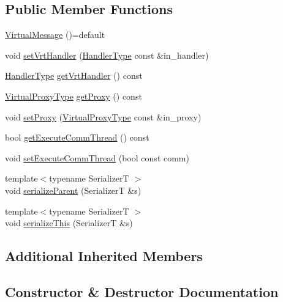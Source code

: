 \subsection*{Public Member Functions}
\begin{DoxyCompactItemize}
\item 
\hyperlink{structvt_1_1vrt_1_1_virtual_message_a28ae0fd29c23d4e9552e659ff7f66cd5}{Virtual\+Message} ()=default
\item 
void \hyperlink{structvt_1_1vrt_1_1_virtual_message_aea0a3a35d2517ef094c9467b0c4ff066}{set\+Vrt\+Handler} (\hyperlink{namespacevt_af64846b57dfcaf104da3ef6967917573}{Handler\+Type} const \&in\+\_\+handler)
\item 
\hyperlink{namespacevt_af64846b57dfcaf104da3ef6967917573}{Handler\+Type} \hyperlink{structvt_1_1vrt_1_1_virtual_message_aaa41fe4b317b868fdcceb7c119feec9c}{get\+Vrt\+Handler} () const
\item 
\hyperlink{namespacevt_a1b417dd5d684f045bb58a0ede70045ac}{Virtual\+Proxy\+Type} \hyperlink{structvt_1_1vrt_1_1_virtual_message_a37cbc50547e033f049af3c9d289036cc}{get\+Proxy} () const
\item 
void \hyperlink{structvt_1_1vrt_1_1_virtual_message_aa4b2b70c7d560be3adff74102803ff51}{set\+Proxy} (\hyperlink{namespacevt_a1b417dd5d684f045bb58a0ede70045ac}{Virtual\+Proxy\+Type} const \&in\+\_\+proxy)
\item 
bool \hyperlink{structvt_1_1vrt_1_1_virtual_message_a9511339ccb737b655708c9071965dc76}{get\+Execute\+Comm\+Thread} () const
\item 
void \hyperlink{structvt_1_1vrt_1_1_virtual_message_a8149137c049179f315d295b5127b61ad}{set\+Execute\+Comm\+Thread} (bool const comm)
\item 
{\footnotesize template$<$typename SerializerT $>$ }\\void \hyperlink{structvt_1_1vrt_1_1_virtual_message_a386aeadd621e63f38bda7d14ff629172}{serialize\+Parent} (SerializerT \&s)
\item 
{\footnotesize template$<$typename SerializerT $>$ }\\void \hyperlink{structvt_1_1vrt_1_1_virtual_message_aaa884a3606e1c569c07c4e7ef94b196d}{serialize\+This} (SerializerT \&s)
\end{DoxyCompactItemize}
\subsection*{Additional Inherited Members}


\subsection{Constructor \& Destructor Documentation}
\mbox{\label{structvt_1_1vrt_1_1_virtual_message_a28ae0fd29c23d4e9552e659ff7f66cd5}} 
